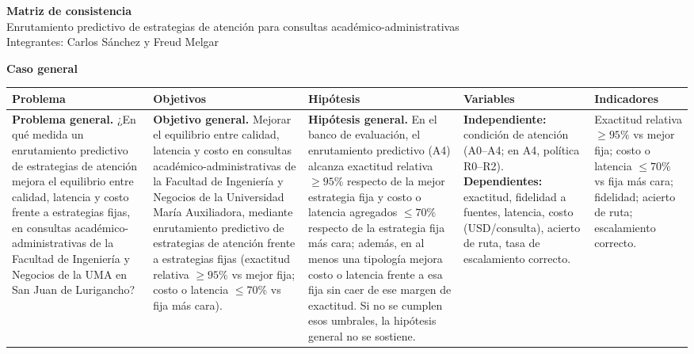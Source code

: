 \documentclass[10pt,a4paper,landscape]{article}
\begin{document}

\begin{center}
{\Large\bfseries Matriz de consistencia}\\[0.28em]
{\normalsize Enrutamiento predictivo de estrategias de atención para consultas académico-administrativas}\\[0.18em]
{\small Integrantes: Carlos Sánchez y Freud Melgar}
\end{center}

\vspace{0.3em}
\noindent\textbf{\small Caso general}\\[0.18em]
{\scriptsize
\setlength{\tabcolsep}{3pt}
\renewcommand{\arraystretch}{1.3}
\begin{tabularx}{\linewidth}{|Y|Y|Y|Y|Y|}
\hline
\textbf{\footnotesize Problema} & \textbf{\footnotesize Objetivos} & \textbf{\footnotesize Hipótesis} & \textbf{\footnotesize Variables} & \textbf{\footnotesize Indicadores} \\
\hline
\textbf{Problema general.} ¿En qué medida un enrutamiento predictivo de estrategias de atención mejora el equilibrio entre calidad, latencia y costo frente a estrategias fijas, en consultas académico-administrativas de la Facultad de Ingeniería y Negocios de la UMA en San Juan de Lurigancho? &
\textbf{Objetivo general.} Mejorar el equilibrio entre calidad, latencia y costo en consultas académico-administrativas de la Facultad de Ingeniería y Negocios de la Universidad María Auxiliadora, mediante enrutamiento predictivo de estrategias de atención frente a estrategias fijas (exactitud relativa $\geq 95\%$ vs mejor fija; costo o latencia $\leq 70\%$ vs fija más cara). &
\textbf{Hipótesis general.} En el banco de evaluación, el enrutamiento predictivo (A4) alcanza exactitud relativa $\geq 95\%$ respecto de la mejor estrategia fija y costo o latencia agregados $\leq 70\%$ respecto de la estrategia fija más cara; además, en al menos una tipología mejora costo o latencia frente a esa fija sin caer de ese margen de exactitud. Si no se cumplen esos umbrales, la hipótesis general no se sostiene. &
\textbf{Independiente:} condición de atención (A0--A4; en A4, política R0--R2). \textbf{Dependientes:} exactitud, fidelidad a fuentes, latencia, costo (USD/consulta), acierto de ruta, tasa de escalamiento correcto. &
Exactitud relativa $\geq 95\%$ vs mejor fija; costo o latencia $\leq 70\%$ vs fija más cara; fidelidad; acierto de ruta; escalamiento correcto. \\
\hline
\end{tabularx}
}
\end{document}
